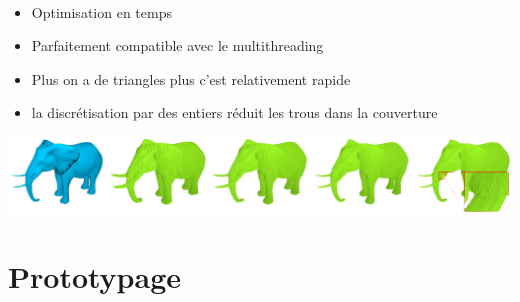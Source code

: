 \begin{frame}[fragile=singleslide]{\insertsectionhead}

  \framesubtitle{\insertsubsectionhead}
  \begin{itemize}
      \item Optimisation en temps
      \item Parfaitement compatible avec le multithreading
      \item Plus on a de triangles plus c'est relativement rapide
      \item la discrétisation par des entiers réduit les trous dans la couverture
    \end{itemize}
    \vspace{0.6cm}
    \begin{center}
        \includegraphics[scale=0.15]{resources/elephant.png}
    \end{center}
\end{frame}

\section{Prototypage}

